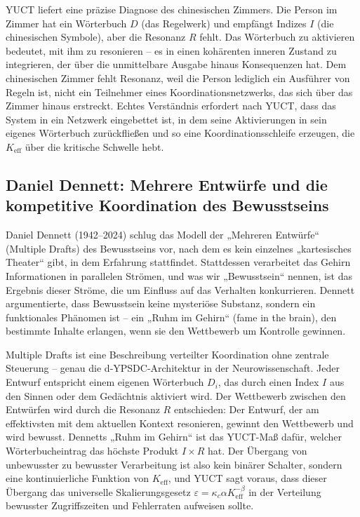 \documentclass[12pt,a4paper]{article}
\begin{document}
	YUCT liefert eine präzise Diagnose des chinesischen Zimmers. Die Person im Zimmer hat ein Wörterbuch \(D\) (das Regelwerk) und empfängt Indizes \(I\) (die chinesischen Symbole), aber die Resonanz \(R\) fehlt. Das Wörterbuch zu aktivieren bedeutet, mit ihm zu resonieren – es in einen kohärenten inneren Zustand zu integrieren, der über die unmittelbare Ausgabe hinaus Konsequenzen hat. Dem chinesischen Zimmer fehlt Resonanz, weil die Person lediglich ein Ausführer von Regeln ist, nicht ein Teilnehmer eines Koordinationsnetzwerks, das sich über das Zimmer hinaus erstreckt. Echtes Verständnis erfordert nach YUCT, dass das System in ein Netzwerk eingebettet ist, in dem seine Aktivierungen in sein eigenes Wörterbuch zurückfließen und so eine Koordinationsschleife erzeugen, die \(K_{\mathrm{eff}}\) über die kritische Schwelle hebt.
	
	\subsection{Daniel Dennett: Mehrere Entwürfe und die kompetitive Koordination des Bewusstseins}
	
	Daniel Dennett (1942–2024) schlug das Modell der „Mehreren Entwürfe“ (Multiple Drafts) des Bewusstseins vor, nach dem es kein einzelnes „kartesisches Theater“ gibt, in dem Erfahrung stattfindet. Stattdessen verarbeitet das Gehirn Informationen in parallelen Strömen, und was wir „Bewusstsein“ nennen, ist das Ergebnis dieser Ströme, die um Einfluss auf das Verhalten konkurrieren. Dennett argumentierte, dass Bewusstsein keine mysteriöse Substanz, sondern ein funktionales Phänomen ist – ein „Ruhm im Gehirn“ (fame in the brain), den bestimmte Inhalte erlangen, wenn sie den Wettbewerb um Kontrolle gewinnen.
	
	Multiple Drafts ist eine Beschreibung verteilter Koordination ohne zentrale Steuerung – genau die d‑YPSDC-Architektur in der Neurowissenschaft. Jeder Entwurf entspricht einem eigenen Wörterbuch \(D_i\), das durch einen Index \(I\) aus den Sinnen oder dem Gedächtnis aktiviert wird. Der Wettbewerb zwischen den Entwürfen wird durch die Resonanz \(R\) entschieden: Der Entwurf, der am effektivsten mit dem aktuellen Kontext resonieren, gewinnt den Wettbewerb und wird bewusst. Dennetts „Ruhm im Gehirn“ ist das YUCT-Maß dafür, welcher Wörterbucheintrag das höchste Produkt \(I \times R\) hat. Der Übergang von unbewusster zu bewusster Verarbeitung ist also kein binärer Schalter, sondern eine kontinuierliche Funktion von \(K_{\mathrm{eff}}\), und YUCT sagt voraus, dass dieser Übergang das universelle Skalierungsgesetz \(\varepsilon = \kappa_c \alpha K_{\mathrm{eff}}^{-\beta}\) in der Verteilung bewusster Zugriffszeiten und Fehlerraten aufweisen sollte.
	
\end{document}
